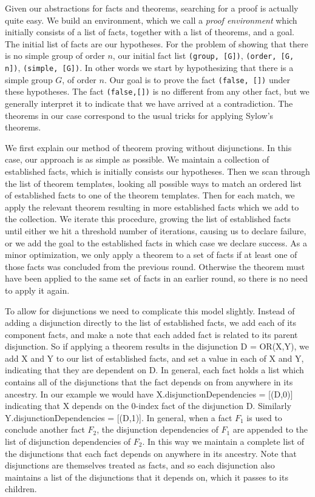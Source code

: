 \documentclass[11pt,
oneside]{article} %
\begin{document}
Given our abstractions for facts and theorems, searching for a proof
is actually quite easy.  We build an environment, which we call a
\textit{proof environment} which initially consists of a list of
facts, together with a list of theorems, and a goal.  The initial list
of facts are our hypotheses.  For the problem of showing that there is
no simple group of order $n$, our initial fact list \texttt{(group,
  [G])}, \texttt{(order, [G, n])}, \texttt{(simple, [G])}.  In other
words we start by hypothesizing that there is a simple group $G$, of
order $n$.  Our goal is to prove the fact \texttt{(false, [])} under
these hypotheses.  The fact \texttt{(false,[])} is no different from
any other fact, but we generally interpret it to indicate that we have
arrived at a contradiction.  The theorems in our case correspond to
the usual tricks for applying Sylow's theorems.

We first explain our method of theorem proving without disjunctions.
In this case, our approach is as simple as possible. We maintain a
collection of established facts, which is initially consists our
hypotheses.  Then we scan through the list of theorem templates,
looking all possible ways to match an ordered list of established
facts to one of the theorem templates.  Then for each match, we apply
the relevant theorem resulting in more established facts which we add
to the collection.  We iterate this procedure, growing the list of
established facts until either we hit a threshold number of
iterations, causing us to declare failure, or we add the goal to the
established facts in which case we declare success.  As a minor
optimization, we only apply a theorem to a set of facts if at least
one of those facts was concluded from the previous round.  Otherwise
the theorem must have been applied to the same set of facts in an
earlier round, so there is no need to apply it again.

To allow for disjunctions we need to complicate this model slightly.
Instead of adding a disjunction directly to the list of established
facts, we add each of its component facts, and make a note that each
added fact is related to its parent disjunction.  So if applying a
theorem results in the disjunction D = OR(X,Y), we add X and Y to our
list of established facts, and set a value in each of X and Y,
indicating that they are dependent on D.  In general, each fact holds
a list which contains all of the disjunctions that the fact depends on
from anywhere in its ancestry.  In our example we would have
X.disjunctionDependencies = [(D,0)] indicating that X depends on the
0-index fact of the disjunction D.  Similarly
Y.disjunctionDependencies = [(D,1)].  In general, when a fact $F_1$ is
used to conclude another fact $F_2$, the disjunction dependencies of
$F_1$ are appended to the list of disjunction dependencies of $F_2$.
In this way we maintain a complete list of the disjunctions that each
fact depends on anywhere in its ancestry.  Note that disjunctions are
themselves treated as facts, and so each disjunction also maintains a
list of the disjunctions that it depends on, which it passes to its
children.
\end{document}
